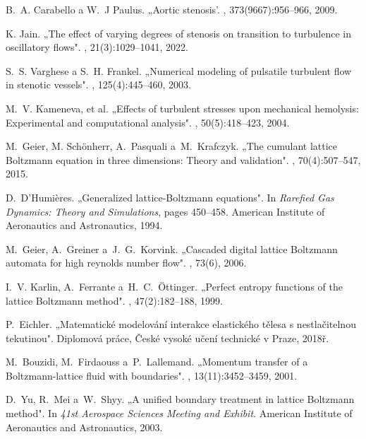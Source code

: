 \begin{thebibliography}{10}
	B.~A. Carabello a W.~J Paulus.
	\newblock „{A}ortic stenosis'.
	, 373(9667):956--966, 2009.
	
	K. Jain.
	\newblock „{T}he effect of varying degrees of stenosis on transition to turbulence
	in oscillatory flows".
	, 21(3):1029--1041,
	2022.
	
	S.~S. Varghese a S.~H. Frankel.
	\newblock „{N}umerical modeling of pulsatile turbulent flow in stenotic vessels".
	, 125(4):445--460,
	2003.
	
	M.~V. Kameneva, et al.
	\newblock „{E}ffects of turbulent stresses upon mechanical hemolysis: Experimental
	and computational analysis".
	, 50(5):418--423, 2004.
	
	M.~Geier{,} M. Schönherr{,} A.~Pasquali a~M.~Krafczyk.
	\newblock „{T}he cumulant lattice Boltzmann equation in three dimensions:
	Theory and validation".
	, 70(4):507--547,
	2015.
	
	D.~D’Humières.
	\newblock „{G}eneralized lattice-Boltzmann equations".
	\newblock In {\em Rarefied Gas Dynamics: Theory and Simulations}, pages
	450--458. American Institute of Aeronautics and Astronautics, 1994.
	
	M.~Geier{,} A.~Greiner a~J.~G.~Korvink.
	\newblock „{C}ascaded digital lattice Boltzmann automata for high reynolds
	number flow".
	, 73(6), 2006.
	
	I.~V. Karlin{,} A.~Ferrante a~H.~C.~Öttinger.
	\newblock „{P}erfect entropy functions of the lattice Boltzmann method".
	, 47(2):182--188, 1999.
	
	P.~Eichler.
	\newblock „Matematické modelování interakce elastického tělesa s nestlačitelnou	tekutinou".
	\newblock Diplomová práce, České vysoké učení technické v Praze, 2018ř.
	
	M.~Bouzidi{,} M.~Firdaouss a~P.~Lallemand.
	\newblock „{M}omentum transfer of a Boltzmann-lattice fluid with boundaries".
	, 13(11):3452--3459, 2001.
	
	D.~Yu{,} R.~Mei a~W.~Shyy.
	\newblock „{A} unified boundary treatment in lattice Boltzmann method".
	\newblock In {\em 41st Aerospace Sciences Meeting and Exhibit}. American
	Institute of Aeronautics and Astronautics, 2003.
	

\end{thebibliography}
